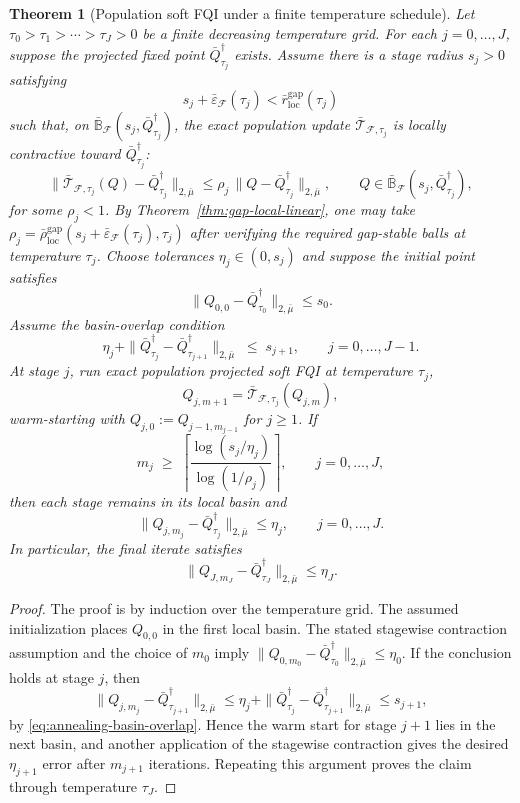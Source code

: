 \documentclass{article}
\theoremstyle{plain}
\newtheorem{theorem}{Theorem}
\theoremstyle{definition}
\theoremstyle{remark}
\begin{document}
\begin{theorem}[Population soft FQI under a finite temperature schedule]
\label{thm:population-temperature-annealing}
Let
$\tau_0>\tau_1>\cdots>\tau_J>0$ be a finite decreasing temperature grid.
For each $j=0,\ldots,J$, suppose the projected fixed point
$\bar Q^\dagger_{\tau_j}$ exists. Assume there is a stage radius \(s_j>0\)
satisfying
\[
s_j+\bar\varepsilon_{\mathcal F}(\tau_j)
<
\bar r_{\mathrm{loc}}^{\mathrm{gap}}(\tau_j)
\]
such that, on
\(\bar{\mathbb B}_{\mathcal F}(s_j,\bar Q^\dagger_{\tau_j})\),
the exact population update $\bar{\mathcal T}_{\mathcal F,\tau_j}$ is locally
contractive toward $\bar Q^\dagger_{\tau_j}$:
\[
\|\bar{\mathcal T}_{\mathcal F,\tau_j}(Q)-\bar Q^\dagger_{\tau_j}\|_{2,\bar\mu}
\le
\rho_j\,
\|Q-\bar Q^\dagger_{\tau_j}\|_{2,\bar\mu},
\qquad Q\in\bar{\mathbb B}_{\mathcal F}(s_j,\bar Q^\dagger_{\tau_j}),
\]
for some $\rho_j<1$. By Theorem~\ref{thm:gap-local-linear}, one may take
\(\rho_j=\bar\rho_{\mathrm{loc}}^{\mathrm{gap}}(s_j+\bar\varepsilon_{\mathcal F}(\tau_j),\tau_j)\)
after verifying the required gap-stable balls at temperature $\tau_j$. Choose tolerances
$\eta_j\in(0,s_j)$ and suppose the initial point satisfies
\[
\|Q_{0,0}-\bar Q^\dagger_{\tau_0}\|_{2,\bar\mu}\le s_0.
\]
Assume the basin-overlap condition
\begin{equation}
\label{eq:annealing-basin-overlap}
\eta_j
+
\|\bar Q^\dagger_{\tau_j}
  -\bar Q^\dagger_{\tau_{j+1}}\|_{2,\bar\mu}
\;\le\;
s_{j+1},
\qquad j=0,\ldots,J-1.
\end{equation}
At stage $j$, run exact population projected soft FQI at temperature $\tau_j$,
\[
Q_{j,m+1}
=
\bar{\mathcal T}_{\mathcal F,\tau_j}(Q_{j,m}),
\]
warm-starting with $Q_{j,0}:=Q_{j-1,m_{j-1}}$ for $j\ge1$. If
\begin{equation}
\label{eq:annealing-iterations}
m_j
\;\ge\;
\left\lceil
\frac{\log(s_j/\eta_j)}{\log(1/\rho_j)}
\right\rceil,
\qquad j=0,\ldots,J,
\end{equation}
then each stage remains in its local basin and
\[
\|Q_{j,m_j}-\bar Q^\dagger_{\tau_j}\|_{2,\bar\mu}
\le
\eta_j,
\qquad j=0,\ldots,J.
\]
In particular, the final iterate satisfies
\[
\|Q_{J,m_J}-\bar Q^\dagger_{\tau_J}\|_{2,\bar\mu}
\le
\eta_J.
\]
\end{theorem}

\begin{proof}
The proof is by induction over the temperature grid.  The assumed initialization
places $Q_{0,0}$ in the first local basin.  The stated stagewise contraction
assumption and the choice of $m_0$ imply
$\|Q_{0,m_0}-\bar Q^\dagger_{\tau_0}\|_{2,\bar\mu}\le\eta_0$. If the
conclusion holds at stage $j$, then
\[
\|Q_{j,m_j}-\bar Q^\dagger_{\tau_{j+1}}\|_{2,\bar\mu}
\le
\eta_j
+
\|\bar Q^\dagger_{\tau_j}
  -\bar Q^\dagger_{\tau_{j+1}}\|_{2,\bar\mu}
\le
s_{j+1},
\]
by \eqref{eq:annealing-basin-overlap}. Hence the warm start for stage $j+1$
lies in the next basin, and another application of the stagewise contraction
gives the desired $\eta_{j+1}$ error after $m_{j+1}$ iterations. Repeating this
argument proves the claim through temperature $\tau_J$.
\end{proof}
\end{document}
